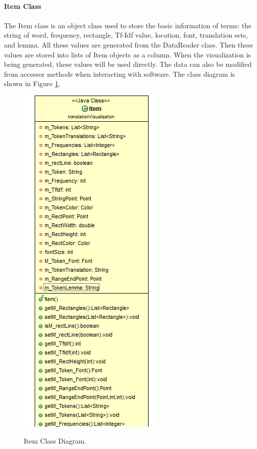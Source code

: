 \paragraph{Item Class}

\paragraph[]{}

The Item class is an object class used to store the basic information of terms: the string of word, frequency, rectangle, Tf-Idf value, location, font, translation sets, and lemma. All these values are generated from the DataReader class. Then these values are stored into lists of Item objects as a column. When the visualization is being generated, these values will be used directly. The data can also be modified from accessor methods when interacting with software. The class diagram is shown in Figure \ref*{fig:item}.

\begin{figure}[H]
	\centering    
	\includegraphics[scale=0.8]{Figs/Item}\\[1ex]
	\caption{Item Class Diagram. }
	\label{fig:item}
\end{figure}

